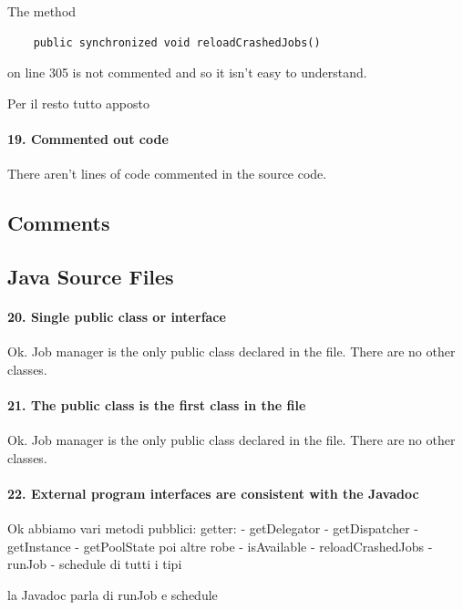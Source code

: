 \documentclass[english]{article}
\begin{document}
The method 

\begin{lstlisting} 
	public synchronized void reloadCrashedJobs() 
\end{lstlisting}
 
 on line 305 is not commented and so it isn't easy to understand.

Per il resto tutto apposto

\paragraph{19. Commented out code}

There aren't lines of code commented in the source code.\subsection{Comments}

\subsection{Java Source Files}
\paragraph{20. Single public class or interface}
Ok.
Job manager is the only public class declared in the file.
There are no other classes.

\paragraph{21. The public class is the first class in the file}
Ok.
Job manager is the only public class declared in the file.
There are no other classes.

\paragraph{22. External program interfaces are consistent with the Javadoc}
Ok
abbiamo vari metodi pubblici:
getter:
- getDelegator
- getDispatcher
- getInstance
- getPoolState
poi altre robe
- isAvailable
- reloadCrashedJobs
- runJob
- schedule di tutti i tipi

la Javadoc parla di runJob e schedule
\end{document}
